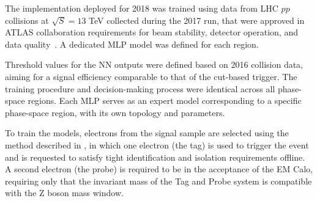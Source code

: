 The \rnn{} implementation deployed for 2018 was trained using data from  LHC $pp$ collisions at $\sqrt{S} = 13$ TeV collected during the 2017 run, that were approved in ATLAS collaboration requirements for beam stability, detector operation, and data quality~\cite{DAPR-2018-01}. A dedicated MLP model was defined for each \eteta region.

Threshold values for the NN outputs were defined based on 2016 collision data, aiming for a signal efficiency comparable to that of the cut-based trigger. The training procedure and decision-making process were identical across all phase-space regions. Each MLP serves as an expert model corresponding to a specific phase-space region, with its own topology and parameters.

%
%
% 


To train the models, electrons from the signal sample are selected using the \tnp method described in \cite{TRIG-2018-05}, in which one electron (the tag) is used to trigger the event and is requested to satisfy tight identification and isolation requirements offline. A second electron (the probe) is required to be in the acceptance of the EM Calo, requiring only that the invariant mass of the Tag and Probe system is compatible with the Z boson mass window. %

